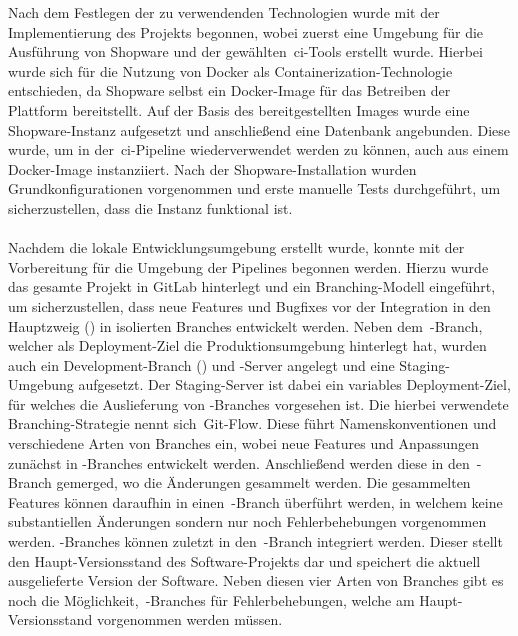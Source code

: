 Nach dem Festlegen der zu verwendenden Technologien wurde mit der Implementierung des Projekts begonnen, wobei
zuerst eine Umgebung für die Ausführung von Shopware und der gewählten\ \acrshort{ci}-Tools erstellt wurde.
Hierbei wurde sich für die Nutzung von Docker als Containerization-Technologie entschieden, da Shopware selbst ein
Docker-Image für das Betreiben der Plattform bereitstellt.
Auf der Basis des bereitgestellten Images wurde eine Shopware-Instanz aufgesetzt und anschließend eine Datenbank
angebunden.
Diese wurde, um in der\ \acrshort{ci}-Pipeline wiederverwendet werden zu können, auch aus einem Docker-Image
instanziiert.
Nach der Shopware-Installation wurden Grundkonfigurationen vorgenommen und erste manuelle Tests durchgeführt, um
sicherzustellen, dass die Instanz funktional ist.
\\\\
Nachdem die lokale Entwicklungsumgebung erstellt wurde, konnte mit der Vorbereitung für die Umgebung der Pipelines
begonnen werden.
Hierzu wurde das gesamte Projekt in GitLab hinterlegt und ein Branching-Modell eingeführt, um sicherzustellen, dass
neue Features und Bugfixes vor der Integration in den Hauptzweig () in isolierten Branches entwickelt
werden.
Neben dem\ -Branch, welcher als Deployment-Ziel die Produktionsumgebung hinterlegt hat, wurden auch
ein Development-Branch () und -Server angelegt und eine Staging-Umgebung aufgesetzt.
Der Staging-Server ist dabei ein variables Deployment-Ziel, für welches die Auslieferung von
-Branches vorgesehen ist.
Die hierbei verwendete Branching-Strategie nennt sich\ \glqq Git-Flow\grqq.
Diese führt Namenskonventionen und verschiedene Arten von Branches ein, wobei neue Features und Anpassungen zunächst in
-Branches entwickelt werden.
Anschließend werden diese in den\ -Branch gemerged, wo die Änderungen gesammelt werden.
Die gesammelten Features können daraufhin in einen\ -Branch überführt werden, in welchem keine
substantiellen Änderungen sondern nur noch Fehlerbehebungen vorgenommen werden.
-Branches können zuletzt in den\ -Branch integriert werden.
Dieser stellt den Haupt-Versionsstand des Software-Projekts dar und speichert die aktuell ausgelieferte Version der
Software.
Neben diesen vier Arten von Branches gibt es noch die Möglichkeit,\ -Branches für Fehlerbehebungen,
welche am Haupt-Versionsstand vorgenommen werden müssen.

